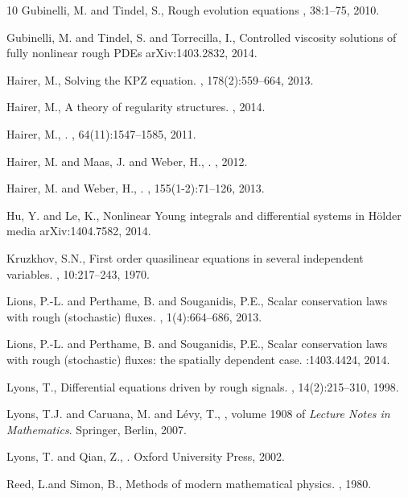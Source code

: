 \documentclass[11pt,a4paper]{amsart}
\numberwithin{equation}{section} %
\begin{document}
\begin{thebibliography}{10}
Gubinelli, M. and Tindel, S.,
\newblock Rough evolution equations
,  38:1--75, 2010.

Gubinelli, M. and Tindel, S. and Torrecilla, I.,
\newblock Controlled viscosity solutions of fully nonlinear rough {PDE}s
\newblock arXiv:1403.2832, 2014.

Hairer, M.,
\newblock Solving the KPZ equation.
, 178(2):559--664, 2013.

Hairer, M.,
\newblock A theory of regularity structures.
, 2014.


 Hairer, M.,
.
, 64(11):1547--1585, 2011.

 Hairer, M. and   Maas, J. and  Weber, H.,
.
, 2012.

 Hairer, M. and  Weber, H.,
.
, 155(1-2):71--126, 2013.


 Hu, Y. and Le, K.,
 \newblock Nonlinear Young integrals and differential systems in H\"older media
 \newblock arXiv:1404.7582, 2014.
 
Kruzkhov, S.N.,
\newblock First order quasilinear equations in several independent variables.
, 10:217--243, 1970.


Lions, P.-L. and Perthame, B. and Souganidis, P.E.,
\newblock Scalar conservation laws with rough (stochastic) fluxes.
, 1(4):664--686, 2013.

Lions, P.-L. and Perthame, B. and Souganidis, P.E.,
\newblock Scalar conservation laws with rough (stochastic) fluxes: the spatially dependent case.
:1403.4424, 2014.


Lyons, T.,  
\newblock Differential equations driven by rough signals.
, 14(2):215--310, 1998. 


Lyons, T.J. and Caruana, M. and  L{\'e}vy, T.,
, volume 1908 of
  {\em {Lecture Notes in Mathematics}}.
\newblock Springer, Berlin, 2007.

Lyons, T. and  Qian, Z.,
.
\newblock Oxford University Press, 2002.




Reed, L.and Simon, B.,
\newblock Methods of modern mathematical physics.
, 1980.



\end{thebibliography}
\end{document}
